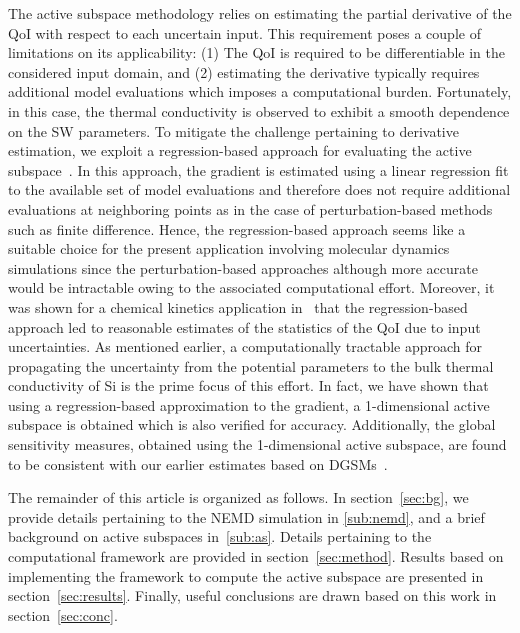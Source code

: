 The active subspace methodology relies on estimating the partial derivative of the QoI 
with respect to each uncertain input. This requirement poses a couple of limitations on its
applicability: (1) The QoI is required to be differentiable in the considered input domain, and (2)
estimating the derivative typically requires additional model evaluations which
imposes a computational burden. Fortunately, in this case,
the thermal conductivity is observed to exhibit a smooth dependence on the SW parameters. 
To mitigate the challenge pertaining to derivative estimation, we exploit 
a regression-based approach for evaluating the active subspace~\cite{Vohra:2018c}. 
In this approach, the gradient is estimated
using a linear regression fit to the available set of model evaluations and therefore does not 
require additional evaluations at neighboring points as in the case of perturbation-based
methods such as finite difference. Hence, the regression-based approach seems like a suitable 
choice for the present application involving molecular dynamics simulations since the
perturbation-based approaches although more accurate would be intractable owing to the
associated computational effort. Moreover, it was shown for a chemical kinetics application
in~\cite{Vohra:2018c} that the regression-based approach led to reasonable estimates of
 the statistics of the QoI due to input uncertainties.
As mentioned earlier, a computationally tractable approach for propagating the uncertainty
from the potential parameters to the bulk thermal conductivity of Si is the prime focus of this  
effort. In fact, we have
shown that using a regression-based approximation to the gradient, a 1-dimensional
active subspace is obtained which is also verified for accuracy. Additionally, the global 
sensitivity measures, obtained using the 1-dimensional active subspace, are found to be consistent with 
our earlier estimates based on DGSMs~\cite{Vohra:2018b}. 

The remainder of this article is organized as follows. In section~\ref{sec:bg}, we provide details
pertaining to the NEMD simulation in \ref{sub:nemd}, and a brief background on active subspaces
in~\ref{sub:as}. 
Details pertaining to the computational framework are
provided in section~\ref{sec:method}. Results based on implementing the framework to
compute the active subspace
are presented in section~\ref{sec:results}. Finally, useful conclusions are drawn based on this
work in section~\ref{sec:conc}.
































